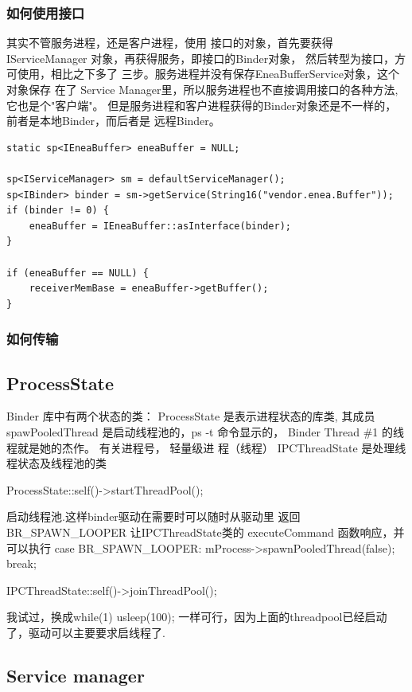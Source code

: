 \documentclass[a4paper,11pt]{article}
\begin{document}
\subsubsection{如何使用接口}
其实不管服务进程，还是客户进程，使用 接口的对象，首先要获得IServiceManager
对象，再获得服务，即接口的Binder对象， 然后转型为接口，方可使用，相比之下多了
三步。服务进程并没有保存EneaBufferService对象，这个对象保存
在了 Service Manager里，所以服务进程也不直接调用接口的各种方法, 它也是个"客户端"。
但是服务进程和客户进程获得的Binder对象还是不一样的，前者是本地Binder，而后者是
远程Binder。 
\begin{lstlisting}
static sp<IEneaBuffer> eneaBuffer = NULL;

sp<IServiceManager> sm = defaultServiceManager();
sp<IBinder> binder = sm->getService(String16("vendor.enea.Buffer"));
if (binder != 0) {
    eneaBuffer = IEneaBuffer::asInterface(binder);
}

if (eneaBuffer == NULL) {
    receiverMemBase = eneaBuffer->getBuffer();
}
\end{lstlisting}

\subsubsection{如何传输}

\subsection{ProcessState}

Binder 库中有两个状态的类：
ProcessState 是表示进程状态的库类, 其成员 spawPooledThread 是启动线程池的，ps
-t 命令显示的， Binder Thread \#1 的线程就是她的杰作。 有关进程号， 轻量级进
程（线程）
IPCThreadState 是处理线程状态及线程池的类

ProcessState::self()->startThreadPool(); 

  启动线程池.这样binder驱动在需要时可以随时从驱动里
  返回 BR_SPAWN_LOOPER 让IPCThreadState类的
  executeCommand 函数响应，并可以执行
  case BR_SPAWN_LOOPER:
  mProcess->spawnPooledThread(false);
  break;


    IPCThreadState::self()->joinThreadPool();
    
    我试过，换成while(1) usleep(100); 一样可行，因为上面的threadpool已经启动
    了，驱动可以主要要求启线程了.

    \subsection{Service manager}\label{process:servicemanager}
\end{document}
